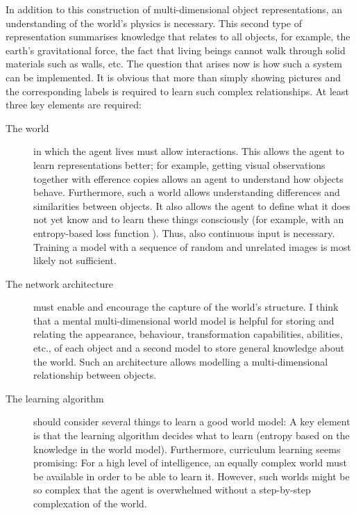 In addition to this construction of multi-dimensional object representations, an understanding of the world's physics is necessary. This second type of representation summarises knowledge that relates to all objects, for example, the earth's gravitational force, the fact that living beings cannot walk through solid materials such as walls, etc. The question that arises now is how such a system can be implemented. It is obvious that more than simply showing pictures and the corresponding labels is required to learn such complex relationships. At least three key elements are required:


\begin{description}
	\item[The world] in which the agent lives must allow interactions. This allows the agent to learn representations better; for example, getting visual observations together with efference copies allows an agent to understand how objects behave. Furthermore, such a world allows understanding differences and similarities between objects. It also allows the agent to define what it does not yet know and to learn these things consciously (for example, with an entropy-based loss function ). Thus, also continuous input is necessary. Training a model with a sequence of random and unrelated images is most likely not sufficient.
	\item[The network architecture] must enable and encourage the capture of the world's structure. I think that a mental multi-dimensional world model is helpful for storing and relating the appearance, behaviour, transformation capabilities, abilities, etc., of each object and a second model to store general knowledge about the world. Such an architecture allows modelling a multi-dimensional relationship between objects.%
	\item[The learning algorithm] should consider several things to learn a good world model: A key element is that the learning algorithm decides what to learn (entropy based on the knowledge in the world model). Furthermore, curriculum learning seems promising: For a high level of intelligence, an equally complex world must be available in order to be able to learn it. However, such worlds might be so complex that the agent is overwhelmed without a step-by-step complexation of the world.%
\end{description}

